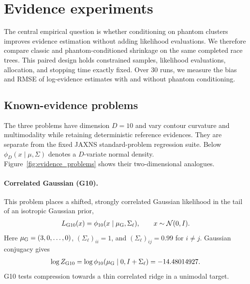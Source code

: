 \documentclass[pdflatex,sn-basic,icol]{sn-jnl}
\theoremstyle{plain}
\theoremstyle{definition}
\begin{document}
\clearpage
\section{Evidence experiments}\label{sec:experiments}

The central empirical question is whether conditioning on phantom clusters improves evidence estimation without adding likelihood evaluations.
We therefore compare classic and phantom-conditioned shrinkage on the same completed race trees.
This paired design holds constrained samples, likelihood evaluations, allocation, and stopping time exactly fixed.
Over 30 runs, we measure the bias and RMSE of log-evidence estimates with and without phantom conditioning.

\subsection{Known-evidence problems}

The three problems have dimension $D=10$ and vary contour curvature and multimodality while retaining deterministic reference evidences.
They are separate from the fixed JAXNS standard-problem regression suite.
Below $\phi_D(x\mid\mu,\Sigma)$ denotes a $D$-variate normal density.
Figure~\ref{fig:evidence_problems} shows their two-dimensional analogues.

\paragraph{Correlated Gaussian (G10).}
This problem places a shifted, strongly correlated Gaussian likelihood in the tail of an isotropic Gaussian prior,
\begin{align}
    L_{\rm G10}(x)=\phi_{10}(x\mid\mu_{\rm G},\Sigma_\ell),\qquad x\sim\mathcal{N}(0,I).
    \label{eq:g10_likelihood}
\end{align}
Here $\mu_{\rm G}=(3,0,\ldots,0)$, $(\Sigma_\ell)_{ii}=1$, and $(\Sigma_\ell)_{ij}=0.99$ for $i\ne j$.
Gaussian conjugacy gives
\begin{align}
    \log Z_{\rm G10}=\log\phi_{10}(\mu_{\rm G}\mid0,I+\Sigma_\ell)
    =-14.48014927. \label{eq:g10_evidence}
\end{align}
G10 tests compression towards a thin correlated ridge in a unimodal target.
\end{document}
